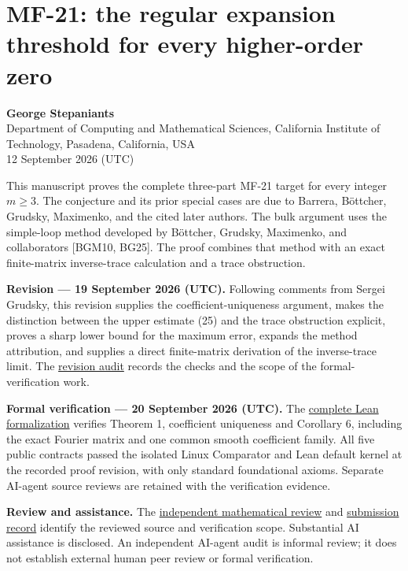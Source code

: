 \documentclass[10pt,a4paper]{article}
\begin{document}
\section*{MF-21: the regular expansion threshold for every higher-order zero}\label{mf-21-the-regular-expansion-threshold-for-every-higher-order-zero}

\textbf{George Stepaniants}\\
Department of Computing and Mathematical Sciences, California Institute of Technology, Pasadena, California, USA\\
12 September 2026 (UTC)

This manuscript proves the complete three-part MF-21 target for every integer \(m\ge3\). The conjecture and its prior special cases are due to Barrera, Böttcher, Grudsky, Maximenko, and the cited later authors. The bulk argument uses the simple-loop method developed by Böttcher, Grudsky, Maximenko, and collaborators {[}BGM10, BG25{]}. The proof combines that method with an exact finite-matrix inverse-trace calculation and a trace obstruction.

\textbf{Revision --- 19 September 2026 (UTC).} Following comments from Sergei Grudsky, this revision supplies the coefficient-uniqueness argument, makes the distinction between the upper estimate (25) and the trace obstruction explicit, proves a sharp lower bound for the maximum error, expands the method attribution, and supplies a direct finite-matrix derivation of the inverse-trace limit. The \href{https://github.com/ajt60gaibb/OpenProblemsInNLA/blob/main/reviews/2026-09-19-mf21/README.md}{revision audit} records the checks and the scope of the formal-verification work.

\textbf{Formal verification --- 20 September 2026 (UTC).} The \href{https://github.com/ajt60gaibb/OpenProblemsInNLA/blob/main/matrix-functions-and-stability/MF-21/lean/README.md}{complete Lean formalization} verifies Theorem 1, coefficient uniqueness and Corollary 6, including the exact Fourier matrix and one common smooth coefficient family. All five public contracts passed the isolated Linux Comparator and Lean default kernel at the recorded proof revision, with only standard foundational axioms. Separate AI-agent source reviews are retained with the verification evidence.

\textbf{Review and assistance.} The \href{https://github.com/ajt60gaibb/OpenProblemsInNLA/blob/main/references/stepaniants-mf21-2026-09-12/independent-review.md}{independent mathematical review} and \href{https://github.com/ajt60gaibb/OpenProblemsInNLA/blob/main/references/stepaniants-mf21-2026-09-12/README.md}{submission record} identify the reviewed source and verification scope. Substantial AI assistance is disclosed. An independent AI-agent audit is informal review; it does not establish external human peer review or formal verification.
\end{document}
